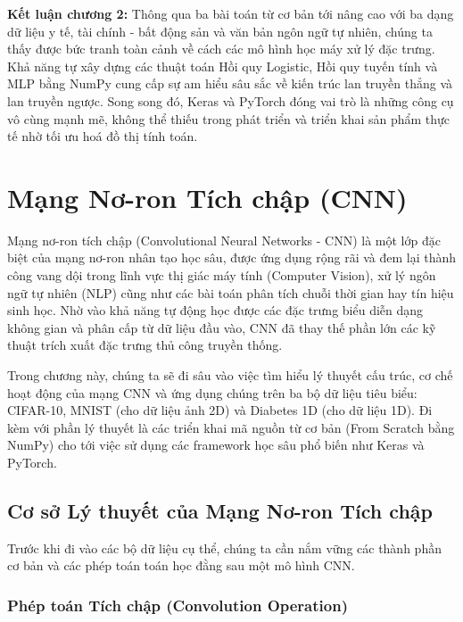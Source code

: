 \documentclass[12pt,a4paper]{article}
\begin{document}
\textbf{Kết luận chương 2:}
Thông qua ba bài toán từ cơ bản tới nâng cao với ba dạng dữ liệu y tế, tài chính - bất động sản và văn bản ngôn ngữ tự nhiên, chúng ta thấy được bức tranh toàn cảnh về cách các mô hình học máy xử lý đặc trưng. Khả năng tự xây dựng các thuật toán Hồi quy Logistic, Hồi quy tuyến tính và MLP bằng NumPy cung cấp sự am hiểu sâu sắc về kiến trúc lan truyền thẳng và lan truyền ngược. Song song đó, Keras và PyTorch đóng vai trò là những công cụ vô cùng mạnh mẽ, không thể thiếu trong phát triển và triển khai sản phẩm thực tế nhờ tối ưu hoá đồ thị tính toán.


\newpage
\section{Mạng Nơ-ron Tích chập (CNN)}

Mạng nơ-ron tích chập (Convolutional Neural Networks - CNN) là một lớp đặc biệt của mạng nơ-ron nhân tạo học sâu, được ứng dụng rộng rãi và đem lại thành công vang dội trong lĩnh vực thị giác máy tính (Computer Vision), xử lý ngôn ngữ tự nhiên (NLP) cũng như các bài toán phân tích chuỗi thời gian hay tín hiệu sinh học. Nhờ vào khả năng tự động học được các đặc trưng biểu diễn dạng không gian và phân cấp từ dữ liệu đầu vào, CNN đã thay thế phần lớn các kỹ thuật trích xuất đặc trưng thủ công truyền thống.

Trong chương này, chúng ta sẽ đi sâu vào việc tìm hiểu lý thuyết cấu trúc, cơ chế hoạt động của mạng CNN và ứng dụng chúng trên ba bộ dữ liệu tiêu biểu: CIFAR-10, MNIST (cho dữ liệu ảnh 2D) và Diabetes 1D (cho dữ liệu 1D). Đi kèm với phần lý thuyết là các triển khai mã nguồn từ cơ bản (From Scratch bằng NumPy) cho tới việc sử dụng các framework học sâu phổ biến như Keras và PyTorch.

\newpage
\subsection{Cơ sở Lý thuyết của Mạng Nơ-ron Tích chập}

Trước khi đi vào các bộ dữ liệu cụ thể, chúng ta cần nắm vững các thành phần cơ bản và các phép toán toán học đằng sau một mô hình CNN.

\subsubsection{Phép toán Tích chập (Convolution Operation)}
\end{document}
